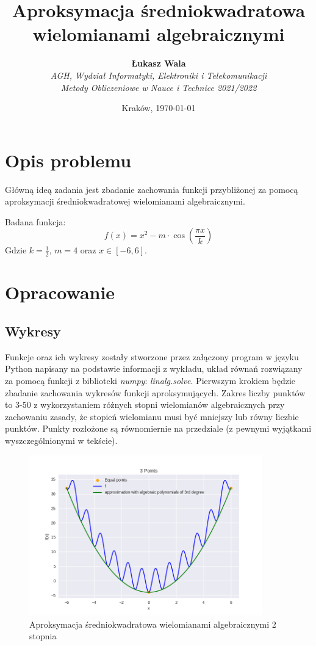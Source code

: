 \documentclass{article}
\title{Aproksymacja średniokwadratowa wielomianami algebraicznymi}
\author{\textbf{Łukasz Wala}\\
    \textit{AGH, Wydział Informatyki, Elektroniki i Telekomunikacji} \\
    \textit{Metody Obliczeniowe w Nauce i Technice 2021/2022}}
\date{Kraków, \today}
\begin{document}
\maketitle

\section{Opis problemu}
Główną ideą zadania jest zbadanie zachowania funkcji przybliżonej za pomocą aproksymacji
średniokwadratowej wielomianami algebraicznymi.

Badana funkcja:
\[f(x)=x^2-m\cdot\cos\left(\frac{\pi x}{k}\right)\]
Gdzie $k=\frac{1}{2}$, $m=4$ oraz $x\in [-6,6]$.

\section{Opracowanie}
\subsection{Wykresy}
Funkcje oraz ich wykresy zostały stworzone przez załączony program w języku Python napisany na podstawie informacji z wykładu, 
układ równań rozwiązany za pomocą funkcji z biblioteki \textit{numpy}: \textit{linalg.solve}. 
Pierwszym krokiem będzie zbadanie zachowania wykresów funkcji aproksymujących. Zakres liczby punktów to 3-50 z wykorzystaniem
różnych stopni wielomianów algebraicznych przy zachowaniu zasady, że stopień wielomianu musi być mniejszy lub równy liczbie punktów.
Punkty rozłożone są równomiernie na przedziale (z pewnymi wyjątkami wyszczególnionymi w tekście).

\begin{figure}[H]
    \centering
    \includegraphics[width=0.9\textwidth]{img/algpoly_2_3.png}
    \caption{Aproksymacja średniokwadratowa wielomianami algebraicznymi 2 stopnia}
\end{figure}
\end{document}
